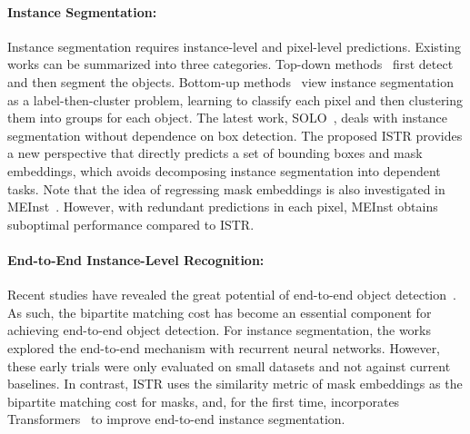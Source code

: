 \documentclass[10pt,twocolumn,letterpaper]{article}
\begin{document}
\paragraph{Instance Segmentation:} Instance segmentation requires instance-level and pixel-level predictions.
Existing works can be summarized into three categories.
Top-down methods~\cite{bolya2019yolact,he2017mask,li2017fully,liu2018path,huang2019mask,chen2019tensormask,chen2020blendmask,lee2020centermask,xie2020polarmask} first detect and then segment the objects.
Bottom-up methods~\cite{yuan2020deep,de2017semantic,liu2017sgn,gao2019ssap} view instance segmentation as a label-then-cluster problem, learning to classify each pixel and then clustering them into groups for each object.
The latest work, SOLO~\cite{wang2020solo,wang2020solov2}, deals with instance segmentation without dependence on box detection.
The proposed ISTR provides a new perspective that directly predicts a set of bounding boxes and mask embeddings, which avoids decomposing instance segmentation into dependent tasks.
Note that the idea of regressing mask embeddings is also investigated in MEInst~\cite{zhang2020mask}.
However, with redundant predictions in each pixel, MEInst obtains suboptimal performance compared to ISTR.
\paragraph{End-to-End Instance-Level Recognition:} Recent studies have revealed the great potential of end-to-end object detection~\cite{hu2018relation,carion2020end,sun2020sparse,wang2020end,zhu2020deformable,zhou2019objects}.
As such, the bipartite matching cost has become an essential component for achieving end-to-end object detection.
For instance segmentation, the works~\cite{ren2017end,romera2016recurrent} explored the end-to-end mechanism with recurrent neural networks.
However, these early trials were only evaluated on small datasets and not against current baselines.
In contrast, ISTR uses the similarity metric of mask embeddings as the bipartite matching cost for masks, and, for the first time, incorporates Transformers~\cite{vaswani2017attention} to improve end-to-end instance segmentation.
\end{document}
